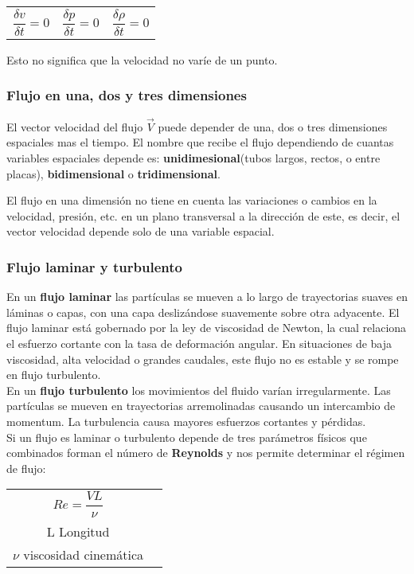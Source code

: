 \begin{tabular}{r c l}
	\centering
	$\dfrac{\delta v}{\delta t} = 0$ & $\dfrac{\delta p}{\delta t} =0$ & $ \dfrac{\delta \rho}{\delta t}=0$
\end{tabular}

Esto no significa que la velocidad no varíe de un punto.

\subsubsection{Flujo en una, dos y tres dimensiones}
El vector velocidad del flujo $\vec{V}$ puede depender de una, dos o tres dimensiones espaciales mas el tiempo. El nombre que recibe el flujo dependiendo de cuantas variables espaciales depende es: \textbf{unidimesional}(tubos largos, rectos, o entre placas), \textbf{bidimensional} o \textbf{tridimensional}. 


El flujo en una dimensión no tiene en cuenta las variaciones o cambios en la velocidad, presión, etc. en un plano transversal a la dirección de este, es decir, el vector velocidad depende solo de una variable espacial.



\subsubsection{Flujo laminar y turbulento}

En un \textbf{flujo laminar} las partículas se mueven a lo largo de trayectorias suaves en láminas o capas, con una capa deslizándose suavemente sobre otra adyacente. El flujo laminar está gobernado por la ley de viscosidad de Newton, la cual relaciona el esfuerzo cortante con la tasa de deformación angular. En situaciones de baja viscosidad, alta velocidad o grandes caudales, este flujo no es estable y se rompe en flujo turbulento.\\

En un \textbf{flujo turbulento} los movimientos del fluido varían irregularmente. Las partículas se mueven en trayectorias arremolinadas causando un intercambio de momentum. La turbulencia causa mayores esfuerzos cortantes y pérdidas.\\

Si un flujo es laminar o turbulento depende de tres parámetros físicos que combinados forman el número de \textbf{Reynolds} y nos permite determinar el régimen de flujo:\\

\begin{tabular}{c c}
		\begin{minipage}[t]{.45\textwidth}
			\flushright 
			\vspace{.05cm}
			$Re= \dfrac{V L}{\nu}$
		\end{minipage}
		&
		\begin{minipage}[t]{.45\textwidth}
			\flushleft
			V velocidad\\
			L Longitud\\
			$\nu$ viscosidad cinemática
		\end{minipage}
\end{tabular}

